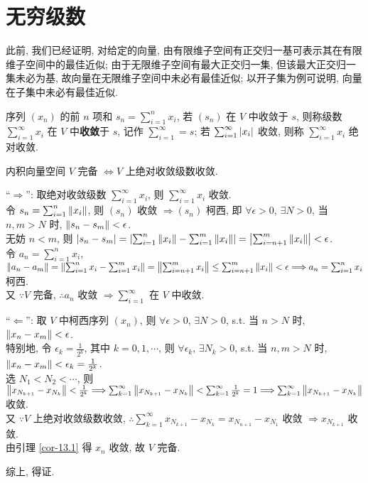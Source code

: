 \documentclass{note}
\begin{document}
\section{无穷级数}
此前, 我们已经证明, 对给定的向量, 由有限维子空间有正交归一基可表示其在有限维子空间中的最佳近似; 由于无限维子空间有最大正交归一集, 但该最大正交归一集未必为基, 故向量在无限维子空间中未必有最佳近似; 以开子集为例可说明, 向量在子集中未必有最佳近似.

\begin{df}[级数收敛和绝对收敛]
    序列 $(x_n)$ 的前 $n$ 项和 $s_n=\sum_{i=1}^nx_i$, 若 $(s_n)$ 在 $V$ 中收敛于 $s$, 则称级数 $\sum_{i=1}^{\infty}x_i$ 在 $V$ 中\textbf{收敛}于 $s$, 记作 $\sum_{i=1}^{\infty}=s$; 若 $\sum_{i=1}^{\infty}\left\lvert x_i\right\rvert$ 收敛, 则称 $\sum_{i=1}^{\infty}x_i$ 绝对收敛.
\end{df}

\begin{thm}
    内积向量空间 $V$ 完备 $\Longleftrightarrow V$ 上绝对收敛级数收敛.
\end{thm}
\begin{pf}
    ``$\Longrightarrow$'': 取绝对收敛级数 $\sum_{i=1}^{\infty}x_i$, 则 $\sum_{i=1}^{\infty}x_i$ 收敛.\\
    令 $s_n=\sum_{i=1}^n\left\lVert x_i\right\rVert$, 则 $(s_n)$ 收敛 $\Longrightarrow(s_n)$ 柯西, 即 $\forall\epsilon>0$, $\exists N>0$, 当 $n,m>N$ 时, $\left\lVert s_n-s_m\right\rVert<\epsilon$.\\
    无妨 $n<m$, 则 $\left\lvert s_n-s_m\right\rvert=\left\lvert\sum_{i=1}^n\left\lVert x_i\right\rVert-\sum_{i=1}^m\left\lVert x_i\right\rVert\right\rvert=\left\lvert\sum_{i=n+1}^m\left\lVert x_i\right\rVert\right\rvert<\epsilon$.\\
    令 $a_n=\sum_{i=1}^nx_i$, $\left\lVert a_n-a_m\right\rVert=\left\lVert\sum_{i=1}^nx_i-\sum_{i=1}^mx_i\right\rVert=\left\lVert\sum_{i=n+1}^mx_i\right\rVert\leq\sum_{i=n+1}^m\left\lVert x_i\right\rVert<\epsilon\Longrightarrow a_n=\sum_{i=1}^nx_i$ 柯西.\\
    又 $\because V$ 完备, $\therefore a_n$ 收敛 $\Longrightarrow\sum_{i=1}^{\infty}$ 在 $V$ 中收敛.

    ``$\Longleftarrow$'': 取 $V$ 中柯西序列 $(x_n)$, 则 $\forall\epsilon>0$, $\exists N>0$, s.t. 当 $n>N$ 时, $\left\lVert x_n-x_m\right\rVert<\epsilon$.\\
    特别地, 令 $\epsilon_k=\frac{1}{2^k}$, 其中 $k=0,1,\cdots$, 则 $\forall\epsilon_k$, $\exists N_k>0$, s.t. 当 $n,m>N$ 时, $\left\lVert x_n-x_m\right\rVert<\epsilon_k=\frac{1}{2^k}$.\\
    选 $N_1<N_2<\cdots$, 则 $\left\lVert x_{N_{k+1}}-x_{N_k}\right\rVert<\frac{1}{2^k}\Longrightarrow\sum_{k=1}^{\infty}\left\lVert x_{N_{k+1}}-x_{N_k}\right\rVert<\sum_{k=1}^{\infty}\frac{1}{2^k}=1\Longrightarrow\sum_{k=1}^{\infty}\left\lVert x_{N_{k+1}}-x_{N_k}\right\rVert$ 收敛.\\
    又 $\because V$ 上绝对收敛级数收敛, $\therefore\sum_{k=1}^{\infty}x_{N_{k+1}}-x_{N_k}=x_{N_{n+1}}-x_{N_1}$ 收敛 $\Longrightarrow x_{N_{k+1}}$ 收敛.\\
    由引理 \ref{cor-13.1} 得 $x_n$ 收敛, 故 $V$ 完备.

    综上, 得证.
\end{pf}
\end{document}
